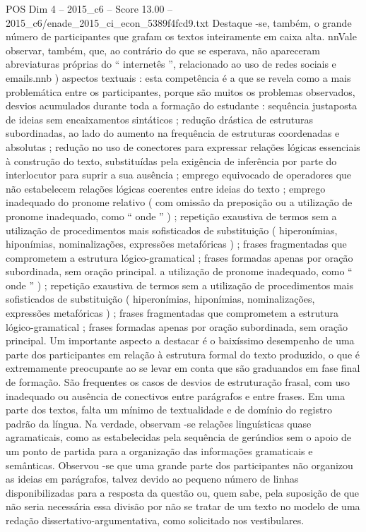 \begin{textsample}{POS Dim 4 – 2015\_c6 – Score 13.00 – 2015\_c6/enade\_2015\_ci\_econ\_5389f4fcd9.txt}
Destaque -se, também, o grande número de participantes que grafam os textos inteiramente em caixa alta. nnVale observar, também, que, ao contrário do que se esperava, não apareceram abreviaturas próprias do “ internetês ”, relacionado ao uso de redes sociais e emails.nnb ) aspectos textuais : esta competência é a que se revela como a mais problemática entre os participantes, porque são muitos os problemas observados, desvios acumulados durante toda a formação do estudante : sequência justaposta de ideias sem encaixamentos sintáticos ; redução drástica de estruturas subordinadas, ao lado do aumento na frequência de estruturas coordenadas e absolutas ; redução no uso de conectores para expressar relações lógicas essenciais à construção do texto, substituídas pela exigência de inferência por parte do interlocutor para suprir a sua ausência ; emprego equivocado de operadores que não estabelecem relações lógicas coerentes entre ideias do texto ; emprego inadequado do pronome relativo ( com omissão da preposição ou a utilização de pronome inadequado, como “ onde ” ) ; repetição exaustiva de termos sem a utilização de procedimentos mais sofisticados de substituição ( hiperonímias, hiponímias, nominalizações, expressões metafóricas ) ; frases fragmentadas que comprometem a estrutura lógico-gramatical ; frases formadas apenas por oração subordinada, sem oração principal. a utilização de pronome inadequado, como “ onde ” ) ; repetição exaustiva de termos sem a utilização de procedimentos mais sofisticados de substituição ( hiperonímias, hiponímias, nominalizações, expressões metafóricas ) ; frases fragmentadas que comprometem a estrutura lógico-gramatical ; frases formadas apenas por oração subordinada, sem oração principal.
Um importante aspecto a destacar é o baixíssimo desempenho de uma parte dos participantes em relação à estrutura formal do texto produzido, o que é extremamente preocupante ao se levar em conta que são graduandos em fase final de formação.
São frequentes os casos de desvios de estruturação frasal, com uso inadequado ou ausência de conectivos entre parágrafos e entre frases.
Em uma parte dos textos, falta um mínimo de textualidade e de domínio do registro padrão da língua.
Na verdade, observam -se relações linguísticas quase agramaticais, como as estabelecidas pela sequência de gerúndios sem o apoio de um ponto de partida para a organização das informações gramaticais e semânticas.
Observou -se que uma grande parte dos participantes não organizou as ideias em parágrafos, talvez devido ao pequeno número de linhas disponibilizadas para a resposta da questão ou, quem sabe, pela suposição de que não seria necessária essa divisão por não se tratar de um texto no modelo de uma redação dissertativo-argumentativa, como solicitado nos vestibulares.

\end{textsample}
